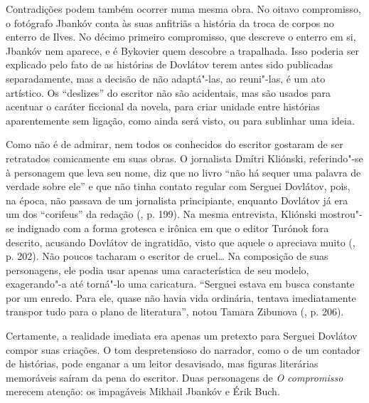 Contradições podem também ocorrer numa mesma obra. No oitavo
compromisso, o fotógrafo Jbankóv conta às suas anfitriãs a história da
troca de corpos no enterro de Ilves. No décimo primeiro compromisso, que
descreve o enterro em si, Jbankóv nem aparece, e é Bykovier quem
descobre a trapalhada. Isso poderia ser explicado pelo fato de as
histórias de Dovlátov terem antes sido publicadas separadamente, mas a
decisão de não adaptá"-las, ao reuni"-las, é um ato artístico. Os
``deslizes'' do escritor não são acidentais, mas são usados para
acentuar o caráter ficcional da novela, para criar unidade entre
histórias aparentemente sem ligação, como ainda será visto, ou para
sublinhar uma ideia.

Como não é de admirar, nem todos os conhecidos do escritor gostaram de
ser retratados comicamente em suas obras. O jornalista Dmítri Kliónski,
referindo"-se à personagem que leva seu nome, diz que no livro ``não há
sequer uma palavra de verdade sobre ele'' e que não tinha contato
regular com Serguei Dovlátov, pois, na época, não passava de um
jornalista principiante, enquanto Dovlátov já era um dos ``corifeus'' da
redação (, p. 199). Na mesma entrevista, Kliónski mostrou"-se
indignado com a forma grotesca e irônica em que o editor Turónok fora
descrito, acusando Dovlátov de ingratidão, visto que aquele o apreciava
muito (, p. 202). Não poucos tacharam o escritor de cruel\ldots{} Na
composição de suas personagens, ele podia usar apenas uma característica
de seu modelo, exagerando"-a até torná"-lo uma caricatura. ``Serguei
estava em busca constante por um enredo. Para ele, quase não havia vida
ordinária, tentava imediatamente transpor tudo para o plano de
literatura'', notou Tamara Zibunova (, p. 206).

\begin{center}
{}
\end{center}

Certamente, a realidade imediata era apenas um pretexto para Serguei
Dovlátov compor suas criações. O tom despretensioso do narrador, como o
de um contador de histórias, pode enganar a um leitor desavisado, mas
figuras literárias memoráveis saíram da pena do escritor. Duas
personagens de \emph{O compromisso} merecem atenção: os impagáveis
Mikhail Jbankóv e Érik Buch.

